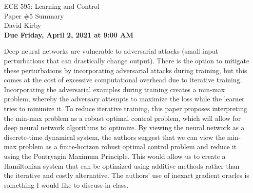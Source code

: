 \documentclass[11pt]{article}
\begin{document}
\begin{center}
\LARGE{ECE 595: Learning and Control\\Paper \#5 Summary}\\[1.5em]
\large David Kirby\\[1.5em]
\large \textbf{Due Friday, April 2, 2021 at 9:00 AM}\\[2.5em]
\end{center}

\noindent Deep neural networks are vulnerable to adversarial attacks (small input perturbations that can drastically change output). There is the option to mitigate these perturbations by incorporating adversarial attacks during training, but this comes at the cost of excessive computational overhead due to iterative training. Incorporating the adversarial examples during training creates a min-max problem, whereby the adversary attempts to maximize the loss while the learner tries to minimize it. To reduce iterative training, this paper proposes interpreting the min-max problem as a robust optimal control problem, which will allow for deep neural network algorithms to optimize. By viewing the neural network as a discrete-time dynamical system, the authors suggest that we can view the min-max problem as a finite-horizon robust optimal control problem and reduce it using the Pontryagin Maximum Principle. This would allow us to create a Hamiltonian system that can be optimized using additive methods rather than the iterative and costly alternative. The authors' use of inexact gradient oracles is something I would like to discuss in class.
\end{document}
